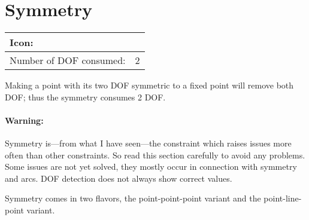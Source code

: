\documentclass[12pt,titlepage]{article}
\newcommand{\icon}[1]{\raisebox{-1em}{\rule{0pt}{27pt}\texttt{[image: images/\#1]}}}
\newcommand{\dofConsumed}{Number of DOF consumed:}
\begin{document}
\section{Symmetry} \label{symmetry} \begin{tabular}{|l|l|} \hline Icon: & \icon{Constraint_Symmetric}\\ \hline \dofConsumed & 2 \\ \hline \end{tabular}

Making a point with its two DOF symmetric to a fixed point will remove both DOF; thus the symmetry consumes 2 DOF.

\paragraph{Warning:} Symmetry is---from what I have seen---the constraint which raises issues more often than other constraints. So read this section carefully to avoid any problems. Some issues are not yet solved, they mostly occur in connection with symmetry and arcs. DOF detection does not always show correct values.

Symmetry comes in two flavors, the point-point-point variant and the point-line-point variant.
\end{document}
